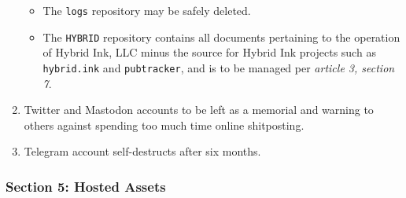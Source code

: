 \begin{enumerate}
  \begin{itemize}
  \tightlist
  \item
    The \texttt{logs} repository may be safely deleted.
  \item
    The \texttt{HYBRID} repository contains all documents pertaining to the operation of Hybrid Ink, LLC minus the source for Hybrid Ink projects such as \texttt{hybrid.ink} and \texttt{pubtracker}, and is to be managed per \emph{article 3, section 7}.
  \end{itemize}
\item
  Twitter and Mastodon accounts to be left as a memorial and warning to others against spending too much time online shitposting.
\item
  Telegram account self-destructs after six months.
\end{enumerate}

\hypertarget{section-5-hosted-assets}{%
\subsubsection*{Section 5: Hosted Assets}\label{section-5-hosted-assets}}


